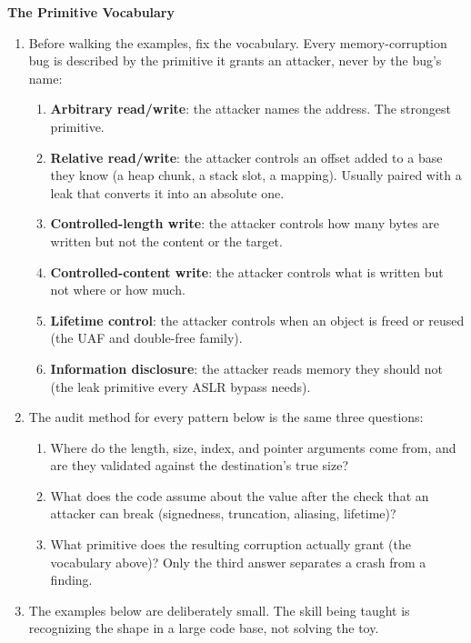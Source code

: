 \documentclass[12pt]{Training}
\begin{document}
\textbf{The Primitive Vocabulary}
\begin{enumerate}
    \item Before walking the examples, fix the vocabulary. Every memory-corruption bug is described by the primitive it grants an attacker, never by the bug's name:
    \begin{enumerate}
        \item \textbf{Arbitrary read/write}: the attacker names the address. The strongest primitive.
        \item \textbf{Relative read/write}: the attacker controls an offset added to a base they know (a heap chunk, a stack slot, a mapping). Usually paired with a leak that converts it into an absolute one.
        \item \textbf{Controlled-length write}: the attacker controls how many bytes are written but not the content or the target.
        \item \textbf{Controlled-content write}: the attacker controls what is written but not where or how much.
        \item \textbf{Lifetime control}: the attacker controls when an object is freed or reused (the UAF and double-free family).
        \item \textbf{Information disclosure}: the attacker reads memory they should not (the leak primitive every ASLR bypass needs).
    \end{enumerate}
    \item The audit method for every pattern below is the same three questions:
    \begin{enumerate}
        \item Where do the length, size, index, and pointer arguments come from, and are they validated against the destination's true size?
        \item What does the code assume about the value after the check that an attacker can break (signedness, truncation, aliasing, lifetime)?
        \item What primitive does the resulting corruption actually grant (the vocabulary above)? Only the third answer separates a crash from a finding.
    \end{enumerate}
    \item The examples below are deliberately small. The skill being taught is recognizing the shape in a large code base, not solving the toy.
\end{enumerate}
\end{document}
